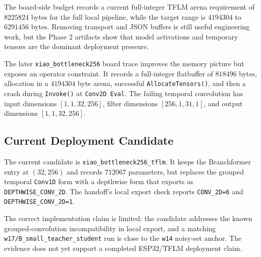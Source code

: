 The board-side budget records a current full-integer TFLM arena requirement of $8225824$ bytes for the full local pipeline, while the target range is $4194304$ to $6291456$ bytes. Removing transport and JSON buffers is still useful engineering work, but the Phase 2 artifacts show that model activations and temporary tensors are the dominant deployment pressure.

The later \texttt{xiao\_bottleneck256} board trace improves the memory picture but exposes an operator constraint. It records a full-integer flatbuffer of $818496$ bytes, allocation in a $4194304$ byte arena, successful \texttt{AllocateTensors()}, and then a crash during \texttt{Invoke()} at \texttt{Conv2D Eval}. The failing temporal convolution has input dimensions $[1,1,32,256]$, filter dimensions $[256,1,31,1]$, and output dimensions $[1,1,32,256]$.

\subsection{Current Deployment Candidate}

The current candidate is \texttt{xiao\_bottleneck256\_tflm}. It keeps the Branchformer entry at $(32,256)$ and records $712067$ parameters, but replaces the grouped temporal \texttt{Conv1D} form with a depthwise form that exports as \texttt{DEPTHWISE\_CONV\_2D}. The handoff's local export check reports \texttt{CONV\_2D=6} and \texttt{DEPTHWISE\_CONV\_2D=1}.

The correct implementation claim is limited: the candidate addresses the known grouped-convolution incompatibility in local export, and a matching \texttt{w17/B\_small\_teacher\_student} run is close to the \texttt{w14} noisy-set anchor. The evidence does not yet support a completed ESP32/TFLM deployment claim.
